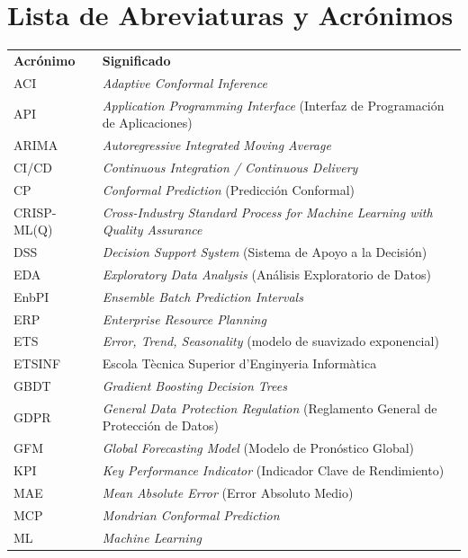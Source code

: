 \chapter*{Lista de Abreviaturas y Acrónimos}

\begin{tabular}{@{}p{3cm}p{10cm}@{}}
\textbf{Acrónimo} & \textbf{Significado} \\[4pt]
ACI       & \textit{Adaptive Conformal Inference} \\
API       & \textit{Application Programming Interface} (Interfaz de Programación de Aplicaciones) \\
ARIMA     & \textit{Autoregressive Integrated Moving Average} \\
CI/CD     & \textit{Continuous Integration / Continuous Delivery} \\
CP        & \textit{Conformal Prediction} (Predicción Conformal) \\
CRISP-ML(Q) & \textit{Cross-Industry Standard Process for Machine Learning with Quality Assurance} \\
DSS       & \textit{Decision Support System} (Sistema de Apoyo a la Decisión) \\
EDA       & \textit{Exploratory Data Analysis} (Análisis Exploratorio de Datos) \\
EnbPI     & \textit{Ensemble Batch Prediction Intervals} \\
ERP       & \textit{Enterprise Resource Planning} \\
ETS       & \textit{Error, Trend, Seasonality} (modelo de suavizado exponencial) \\
ETSINF    & Escola Tècnica Superior d'Enginyeria Informàtica \\
GBDT      & \textit{Gradient Boosting Decision Trees} \\
GDPR      & \textit{General Data Protection Regulation} (Reglamento General de Protección de Datos) \\
GFM       & \textit{Global Forecasting Model} (Modelo de Pronóstico Global) \\
KPI       & \textit{Key Performance Indicator} (Indicador Clave de Rendimiento) \\
MAE       & \textit{Mean Absolute Error} (Error Absoluto Medio) \\
MCP       & \textit{Mondrian Conformal Prediction} \\
ML        & \textit{Machine Learning} \\

\end{tabular}
